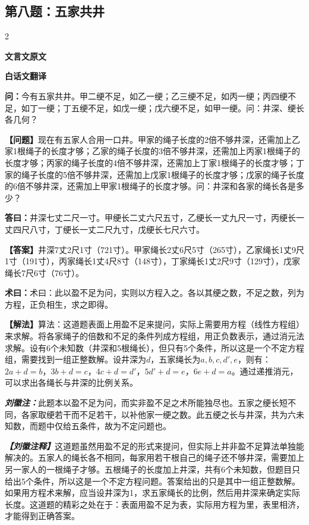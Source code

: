 \documentclass[10pt,a4paper]{article}
\newcommand{\wen}[1]{\textbf{\color{problemcolor}问：}#1\par}
\newcommand{\da}[1]{\textbf{答曰：}#1\par}
\newcommand{\shu}[1]{\textbf{术曰：}#1\par}
\newcommand{\liuhui}[1]{{\color{commentarycolor}\textit{\textbf{刘徽注：}}#1\par}}
\newcommand{\classicalheader}[1]{{\centering\large\bfseries\color{classicalcolor} #1\par\vspace{0.5em}}}
\newcommand{\wenmodern}[1]{\textbf{\color{moderncolor}【问题】}#1\par}
\newcommand{\damodern}[1]{\textbf{【答案】}#1\par}
\newcommand{\shumodern}[1]{\textbf{【解法】}#1\par}
\newcommand{\liuhuimodern}[1]{{\color{commentarycolor}\textit{\textbf{【刘徽注释】}}#1\par}}
\newcommand{\modernheader}[1]{{\centering\large\bfseries\color{moderncolor} #1\par\vspace{0.5em}}}
\newcommand{\problemsec}[1]{\subsection*{#1}}
\begin{document}
\problemsec{第八题：五家共井}
\begin{paracol}{2}
\classicalheader{文言文原文}
\switchcolumn
\modernheader{白话文翻译}
\switchcolumn*

\wen{今有五家共井。甲二绠不足，如乙一绠；乙三绠不足，如丙一绠；丙四绠不足，如丁一绠；丁五绠不足，如戊一绠；戊六绠不足，如甲一绠。问：井深、绠长各几何？}

\switchcolumn

\wenmodern{现在有五家人合用一口井。甲家的绳子长度的2倍不够井深，还需加上乙家1根绳子的长度才够；乙家的绳子长度的3倍不够井深，还需加上丙家1根绳子的长度才够；丙家的绳子长度的4倍不够井深，还需加上丁家1根绳子的长度才够；丁家的绳子长度的5倍不够井深，还需加上戊家1根绳子的长度才够；戊家的绳子长度的6倍不够井深，还需加上甲家1根绳子的长度才够。问：井深和各家的绳长各是多少？}

\switchcolumn*

\da{井深七丈二尺一寸。甲绠长二丈六尺五寸，乙绠长一丈九尺一寸，丙绠长一丈四尺八寸，丁绠长一丈二尺九寸，戊绠长七尺六寸。}

\switchcolumn

\damodern{井深7丈2尺1寸（721寸）。甲家绳长2丈6尺5寸（265寸），乙家绳长1丈9尺1寸（191寸），丙家绳长1丈4尺8寸（148寸），丁家绳长1丈2尺9寸（129寸），戊家绳长7尺6寸（76寸）。}

\switchcolumn*

\shu{术曰：此以盈不足为问，实则以方程入之。各以其绠之数，不足之数，列为方程，正负相生，求之即得。}

\switchcolumn

\shumodern{算法：这道题表面上用盈不足来提问，实际上需要用方程（线性方程组）来求解。将各家绳子的倍数和不足的条件列成方程组，用正负数表示，通过消元法求解。设有6个未知数（井深和5根绳长），但只有5个条件，所以这是一个不定方程组，需要找到一组正整数解。设井深为$d$，五家绳长为$a,b,c,d',e$，则有：$2a+d=b$，$3b+d=c$，$4c+d=d'$，$5d'+d=e$，$6e+d=a$。通过递推消元，可以求出各绳长与井深的比例关系。}

\switchcolumn*

\liuhui{此题本以盈不足为问，而实非盈不足之术所能独尽也。五家之绠长短不同，各家取绠若干而不足若干，以补他家一绠之数。此五绠之长与井深，共为六未知数，而题中仅给五条件，故为不定问题也。}

\switchcolumn

\liuhuimodern{这道题虽然用盈不足的形式来提问，但实际上并非盈不足算法单独能解决的。五家人的绳长各不相同，每家用若干根自己的绳子还不够井深，需要加上另一家人的一根绳子才够。五根绳子的长度加上井深，共有6个未知数，但题目只给出5个条件，所以这是一个不定方程问题。答案给出的只是其中一组正整数解。如果用方程术来解，应当设井深为1，求五家绳长的比例，然后用井深来确定实际长度。这道题的精彩之处在于：表面用盈不足为表，实际用方程为里，表里相济，才能得到正确答案。}

\end{paracol}
\end{document}
